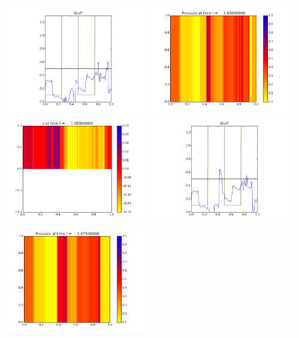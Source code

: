 \documentclass[11pt]{article}
\begin{document}
\vskip 10pt 
\includegraphics[width=0.475\textwidth]{frame0041fig3.png}
\vskip 10pt 
\includegraphics[width=0.475\textwidth]{frame0042fig0.png}
\includegraphics[width=0.475\textwidth]{frame0042fig1.png}
\vskip 10pt 
\includegraphics[width=0.475\textwidth]{frame0042fig3.png}
\vskip 10pt 
\includegraphics[width=0.475\textwidth]{frame0043fig0.png}
\end{document}
